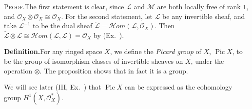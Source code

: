{\par\smallskip\noindent\textsc{Proof.}\enspace The first statement is clear, since $\mathcal L$ and $\mathcal M$ are both locally free of rank $1$, and $\mathcal O_X\otimes\mathcal O_X\cong\mathcal O_X$. For the second statement, let $\mathcal L$ be any invertible sheaf, and take $\mathcal L^{-1}$ to be the dual sheaf $\check{\mathcal L}=\mathcal Hom(\mathcal L,\mathcal O_X)$. Then $\check{\mathcal L}\otimes\mathcal L\cong\mathcal Hom(\mathcal L,\mathcal L)=\mathcal O_X$ by (Ex.\ ).

\par\smallskip\noindent\textbf{Definition.}\enspace For any ringed space $X$, we define the \emph{Picard group} of $X$, $\operatorname{Pic}X$, to be the group of isomorphism classes of invertible sheaves on $X$, under the operation $\otimes$. The proposition shows that in fact it is a group.

 We will see later (III, Ex.\ ) that $\operatorname{Pic}X$ can be expressed as the cohomology group $H^1(X,\mathcal O_X^*)$.
}

